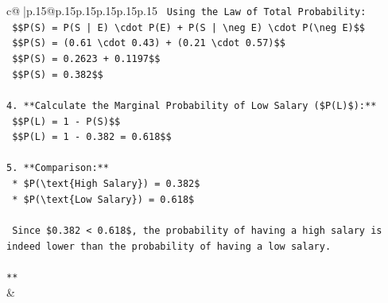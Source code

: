 \documentclass{article}
\begin{document}
{\begin{supertabular}{c@{$\;$}|p{.15\linewidth}@{}p{.15\linewidth}p{.15\linewidth}p{.15\linewidth}p{.15\linewidth}p{.15\linewidth}}
{{{\texttt{    Using the Law of Total Probability:} \\
\texttt{    \$\$P(S) = P(S | E) \textbackslash{}cdot P(E) + P(S | \textbackslash{}neg E) \textbackslash{}cdot P(\textbackslash{}neg E)\$\$} \\
\texttt{    \$\$P(S) = (0.61 \textbackslash{}cdot 0.43) + (0.21 \textbackslash{}cdot 0.57)\$\$} \\
\texttt{    \$\$P(S) = 0.2623 + 0.1197\$\$} \\
\texttt{    \$\$P(S) = 0.382\$\$} \\
\\ 
\texttt{4.  **Calculate the Marginal Probability of Low Salary (\$P(L)\$):**} \\
\texttt{    \$\$P(L) = 1 {-} P(S)\$\$} \\
\texttt{    \$\$P(L) = 1 {-} 0.382 = 0.618\$\$} \\
\\ 
\texttt{5.  **Comparison:**} \\
\texttt{    *   \$P(\textbackslash{}text\{High Salary\}) = 0.382\$} \\
\texttt{    *   \$P(\textbackslash{}text\{Low Salary\}) = 0.618\$} \\
\\ 
\texttt{    Since \$0.382 < 0.618\$, the probability of having a high salary is indeed lower than the probability of having a low salary.} \\
\\ 
\texttt{**} \\
            }
        }
    }
    & \\ \\


\end{supertabular}}
\end{document}
